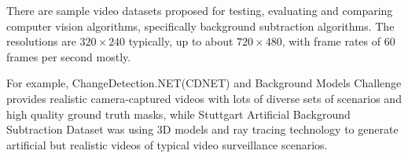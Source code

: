 There are sample video datasets proposed for testing, evaluating and comparing computer vision algorithms, specifically background subtraction algorithms. The resolutions are $320 \times 240$ typically, up to about $720 \times 480$, with frame rates of $60$ frames per second mostly.

For example, ChangeDetection.NET(CDNET) \cite{goyette2012changedetection} and Background Models Challenge \cite{vacavant2012benchmark} provides realistic camera-captured videos with lots of diverse sets of scenarios and high quality ground truth masks, while Stuttgart Artificial Background Subtraction Dataset \cite{brutzer2011evaluation} was using 3D models and ray tracing technology to generate artificial but realistic videos of typical video surveillance scenarios.
